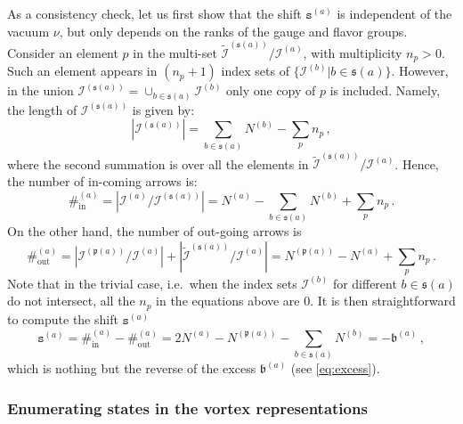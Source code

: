 \documentclass[12pt,a4paper]{article}
\renewcommand{\(}{\left(}
\renewcommand{\)}{\right)}
\renewcommand{\(}{\left(}
\renewcommand{\)}{\right)}
\begin{document}
\medskip

As a consistency check, let us first show that the shift $\mathtt{s}^{(a)}$ is independent of the vacuum $\nu$, but only depends on the ranks of the gauge and flavor groups.
Consider an element $p$ in the multi-set $\tilde{\mathcal{I}}^{(\mathfrak{s}(a))}/\mathcal{I}^{(a)}$, with multiplicity $n_p > 0$. 
Such an element appears in $(n_p+1)$ index sets of $\{\mathcal{I}^{(b)}|b\in \mathfrak{s}(a)\}$. 
However, in the union $\mathcal{I}^{(\mathfrak{s}(a))}=\cup_{b\in \mathfrak{s}(a)}\mathcal{I}^{(b)}$ only one copy of $p$ is included. 
Namely, the length of $\mathcal{I}^{(\mathfrak{s}(a))}$ is given by:
\begin{equation}
    |\mathcal{I}^{(\mathfrak{s}(a))}|=\sum_{b\in\mathfrak{s}(a)}N^{(b)}-\sum_p n_p\,,
\end{equation}
where the second summation is over all the elements in $\tilde{\mathcal{I}}^{(\mathfrak{s}(a))}/\mathcal{I}^{(a)}$. 
Hence, the number of in-coming arrows is:
\begin{equation}
\#^{(a)}_{\text{in}}=|\mathcal{I}^{(a)}/\mathcal{I}^{(\mathfrak{s}(a))}|=N^{(a)}-\sum_{b\in\mathfrak{s}(a)}N^{(b)}+\sum_p n_p\,.
\end{equation}
On the other hand, the number of out-going arrows is
\begin{equation}
\#^{(a)}_{\text{out}}=|\mathcal{I}^{(\mathfrak{p}(a))}/\mathcal{I}^{(a)}|+|\tilde{\mathcal{I}}^{(\mathfrak{s}(a))}/\mathcal{I}^{(a)}|=N^{(\mathfrak{p}(a))}-N^{(a)}+\sum_p n_p\,.
\end{equation}
Note that in the trivial case, i.e.\ when the index sets $\mathcal{I}^{(b)}$ for different $b\in \mathfrak{s}(a)$ do not intersect, all the $n_p$ in the equations above are 0.
It is then straightforward to compute the shift $\mathtt{s}^{(a)}$
\begin{equation}
\mathtt{s}^{(a)}=\#^{(a)}_{\text{in}}-\#^{(a)}_{\text{out}}=2N^{(a)}-N^{(\mathfrak{p}(a))}-\sum_{b\in\mathfrak{s}(a)}N^{(b)}=-\mathfrak{b}^{(a)}\,,
\end{equation}
which is nothing but the reverse of the excess $\mathfrak{b}^{(a)}$ (see \eqref{eq:excess}).


\subsubsection{Enumerating states in the vortex representations}\label{sssec:vortex_representation}
\end{document}

